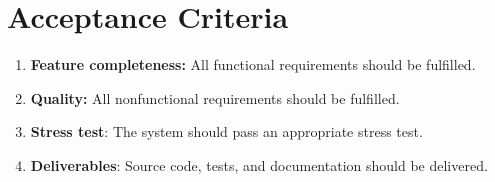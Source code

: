 \documentclass[a4paper]{article}
\begin{document}
\section{Acceptance Criteria}
\begin{enumerate}[leftmargin=*,labelindent=16pt,label=\bfseries AC\arabic*. \hspace{0.1cm}]
\item \textbf{Feature completeness:} All functional requirements should be fulfilled.
\item \textbf{Quality:} All nonfunctional requirements should be fulfilled.
\item \textbf{Stress test}: The system should pass an appropriate stress test.
\item \textbf{Deliverables}: Source code, tests, and documentation should be delivered.

\end{enumerate}
\end{document}
